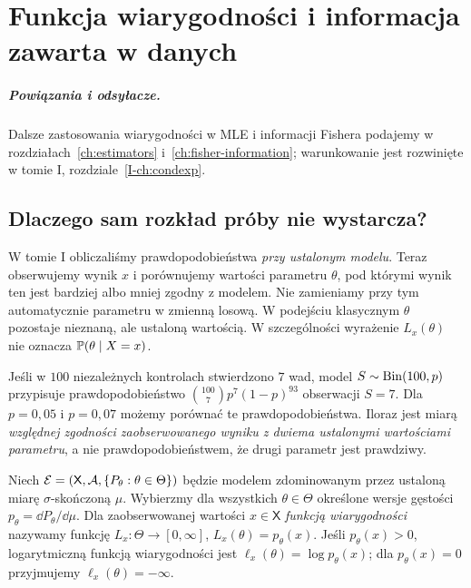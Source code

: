 \chapter{Funkcja wiarygodności i informacja zawarta w danych}
\label{ch:likelihood}
\paragraph{Powiązania i odsyłacze.} Dalsze zastosowania wiarygodności w MLE i informacji Fishera podajemy w rozdziałach~\ref{ch:estimators} i~\ref{ch:fisher-information}; warunkowanie jest rozwinięte w tomie I, rozdziale~\ref{I-ch:condexp}.


\section{Dlaczego sam rozkład próby nie wystarcza?}
W tomie I obliczaliśmy prawdopodobieństwa \emph{przy ustalonym modelu}. Teraz
obserwujemy wynik $x$ i porównujemy wartości parametru $\theta$, pod którymi
wynik ten jest bardziej albo mniej zgodny z modelem. Nie zamieniamy przy tym
automatycznie parametru w zmienną losową. W podejściu klasycznym $\theta$
pozostaje nieznaną, ale ustaloną wartością. W szczególności wyrażenie
$L_x(\theta)$ nie oznacza $\mathbb P(\theta\mid X=x)$.

\begin{przyklad}
Jeśli w $100$ niezależnych kontrolach stwierdzono $7$ wad, model
$S\sim\operatorname{Bin}(100,p)$ przypisuje prawdopodobieństwo
$\binom{100}{7}p^7(1-p)^{93}$ obserwacji $S=7$. Dla $p=0{,}05$ i $p=0{,}07$
możemy porównać te prawdopodobieństwa. Iloraz jest miarą \emph{względnej
zgodności zaobserwowanego wyniku z dwiema ustalonymi wartościami parametru},
a nie prawdopodobieństwem, że drugi parametr jest prawdziwy.
\end{przyklad}

\begin{definicja}\label{def:likelihood}
Niech $\mathcal E=(\mathsf X,\mathcal A,\{P_\theta:\theta\in\Theta\})$ będzie
modelem zdominowanym przez ustaloną miarę $\sigma$-skończoną $\mu$.
Wybierzmy dla wszystkich $\theta\in\Theta$ określone wersje gęstości
$p_\theta=\dd P_\theta/\dd\mu$. Dla zaobserwowanej wartości $x\in\mathsf X$
\emph{funkcją wiarygodności} nazywamy funkcję
$L_x:\Theta\to[0,\infty]$, $L_x(\theta)=p_\theta(x)$.
Jeśli $p_\theta(x)>0$, logarytmiczną funkcją wiarygodności jest
$\ell_x(\theta)=\log p_\theta(x)$; dla $p_\theta(x)=0$ przyjmujemy
$\ell_x(\theta)=-\infty$.
\end{definicja}

